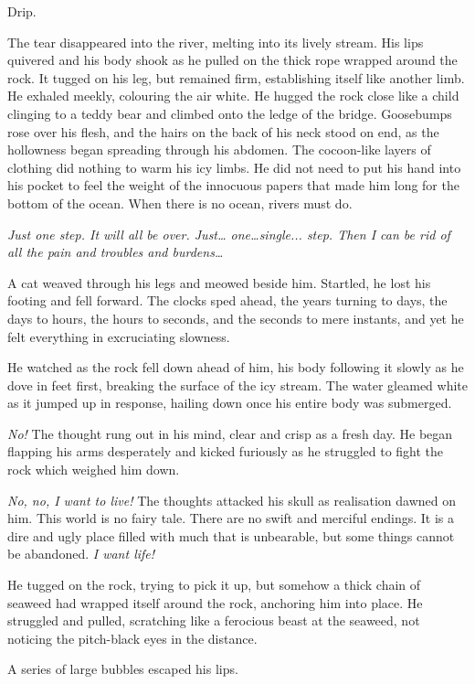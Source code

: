 Drip.                                

The tear disappeared into the river, melting into its lively stream. His lips quivered and his body shook as he pulled on the thick rope wrapped around the rock. It tugged on his leg, but remained firm, establishing itself like another limb. He exhaled meekly, colouring the air white. He hugged the rock close like a child clinging to a teddy bear and climbed onto the ledge of the bridge. Goosebumps rose over his flesh, and the hairs on the back of his neck stood on end, as the hollowness began spreading through his abdomen. The cocoon-like layers of clothing did nothing to warm his icy limbs. He did not need to put his hand into his pocket to feel the weight of the innocuous papers that made him long for the bottom of the ocean. When there is no ocean, rivers must do. 

\emph{Just one step. It will all be over. Just… one…single... step. Then I can be rid of all the pain and troubles and burdens…}

A cat weaved through his legs and meowed beside him. Startled, he lost his footing and fell forward. The clocks sped ahead, the years turning to days, the days to hours, the hours to seconds, and the seconds to mere instants, and yet he felt everything in excruciating slowness.

He watched as the rock fell down ahead of him, his body following it slowly as he dove in feet first, breaking the surface of the icy stream. The water gleamed white as it jumped up in response, hailing down once his entire body was submerged.

\emph{No!} The thought rung out in his mind, clear and crisp as a fresh day. He began flapping his arms desperately and kicked furiously as he struggled to fight the rock which weighed him down.

\emph{No, no, I want to live!} The thoughts attacked his skull as realisation dawned on him. This world is no fairy tale. There are no swift and merciful endings. It is a dire and ugly place filled with much that is unbearable, but some things cannot be abandoned. \emph{I want life!}

He tugged on the rock, trying to pick it up, but somehow a thick chain of seaweed had wrapped itself around the rock, anchoring him into place. He struggled and pulled, scratching like a ferocious beast at the seaweed, not noticing the pitch-black eyes in the distance.

A series of large bubbles escaped his lips. 

